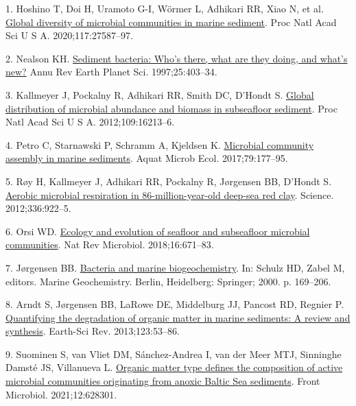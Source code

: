 \documentclass[
  12 pt,
]{article}
\newlength{\cslhangindent}
\newlength{\cslentryspacingunit} %
\newenvironment{CSLReferences}[2] %
 {%
  \setlength{\parindent}{0pt}
  \ifodd #1
  \let\oldpar\par
  \def\par{\hangindent=\cslhangindent\oldpar}
  \fi
  \setlength{\parskip}{#2\cslentryspacingunit}
 }%
 {}
\begin{document}
\hypertarget{refs}{}
\begin{CSLReferences}{0}{0}
\leavevmode{}%
1. Hoshino T, Doi H, Uramoto G-I, Wörmer L, Adhikari RR, Xiao N, et al. \href{https://doi.org/10.1073/pnas.1919139117}{Global diversity of microbial communities in marine sediment}. Proc Natl Acad Sci U S A. 2020;117:27587--97.

\leavevmode{}%
2. Nealson KH. \href{https://doi.org/10.1146/annurev.earth.25.1.403}{Sediment bacteria: Who's there, what are they doing, and what's new?} Annu Rev Earth Planet Sci. 1997;25:403--34.

\leavevmode{}%
3. Kallmeyer J, Pockalny R, Adhikari RR, Smith DC, D'Hondt S. \href{https://doi.org/10.1073/pnas.1203849109}{Global distribution of microbial abundance and biomass in subseafloor sediment}. Proc Natl Acad Sci U S A. 2012;109:16213--6.

\leavevmode{}%
4. Petro C, Starnawski P, Schramm A, Kjeldsen K. \href{https://doi.org/10.3354/ame01826}{Microbial community assembly in marine sediments}. Aquat Microb Ecol. 2017;79:177--95.

\leavevmode{}%
5. Røy H, Kallmeyer J, Adhikari RR, Pockalny R, Jørgensen BB, D'Hondt S. \href{https://doi.org/10.1126/science.1219424}{Aerobic microbial respiration in 86-million-year-old deep-sea red clay}. Science. 2012;336:922--5.

\leavevmode{}%
6. Orsi WD. \href{https://doi.org/10.1038/s41579-018-0046-8}{Ecology and evolution of seafloor and subseafloor microbial communities}. Nat Rev Microbiol. 2018;16:671--83.

\leavevmode{}%
7. Jørgensen BB. \href{https://doi.org/10.1007/978-3-662-04242-7_5}{Bacteria and marine biogeochemistry}. In: Schulz HD, Zabel M, editors. Marine {Geochemistry}. Berlin, Heidelberg: Springer; 2000. p. 169--206.

\leavevmode{}%
8. Arndt S, Jørgensen BB, LaRowe DE, Middelburg JJ, Pancost RD, Regnier P. \href{https://doi.org/10.1016/j.earscirev.2013.02.008}{Quantifying the degradation of organic matter in marine sediments: A review and synthesis}. Earth-Sci Rev. 2013;123:53--86.

\leavevmode{}%
9. Suominen S, van Vliet DM, Sánchez-Andrea I, van der Meer MTJ, Sinninghe Damsté JS, Villanueva L. \href{https://doi.org/10.3389/fmicb.2021.628301}{Organic matter type defines the composition of active microbial communities originating from anoxic {Baltic Sea} sediments}. Front Microbiol. 2021;12:628301.


\end{CSLReferences}
\end{document}
